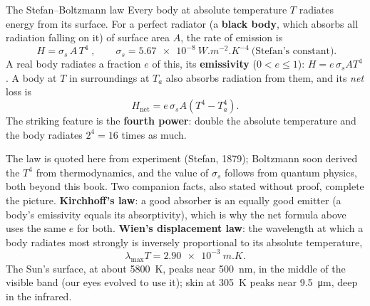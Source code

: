 \begin{keybox}{The Stefan--Boltzmann law}
Every body at absolute temperature $T$ radiates energy from its surface. For a perfect radiator (a
\textbf{black body}, which absorbs all radiation falling on it) of surface area $A$, the rate of
emission is
\[
\boxed{\;H = \sigma_{\!s}\,A\,T^4\;}, \qquad
\sigma_{\!s} = \SI{5.67e-8}{W.m^{-2}.K^{-4}}\ \text{(Stefan's constant)}.
\]
A real body radiates a fraction $e$ of this, its \textbf{emissivity} ($0<e\le1$):
$H = e\,\sigma_{\!s}AT^4$. A body at $T$ in surroundings at $T_a$ also absorbs radiation from them, and
its \emph{net} loss is
\[
H_{\text{net}} = e\,\sigma_{\!s}A\left(T^4 - T_a^4\right).
\]
The striking feature is the \textbf{fourth power}: double the absolute temperature and the body
radiates $2^4 = 16$ times as much.
\end{keybox}

The law is quoted here from experiment (Stefan, 1879); Boltzmann soon derived the $T^4$ from
thermodynamics, and the value of $\sigma_{\!s}$ follows from quantum physics, both beyond this book. Two
companion facts, also stated without proof, complete the picture. \textbf{Kirchhoff's law}: a good
absorber is an equally good emitter (a body's emissivity equals its absorptivity), which is why the net
formula above uses the same $e$ for both. \textbf{Wien's displacement law}: the wavelength at which a
body radiates most strongly is inversely proportional to its absolute temperature,
\[
\lambda_{\max}T = \SI{2.90e-3}{m.K}.
\]
The Sun's surface, at about \SI{5800}{K}, peaks near \SI{500}{nm}, in the middle of the visible band
(our eyes evolved to use it); skin at \SI{305}{K} peaks near \SI{9.5}{\micro m}, deep in the infrared.



